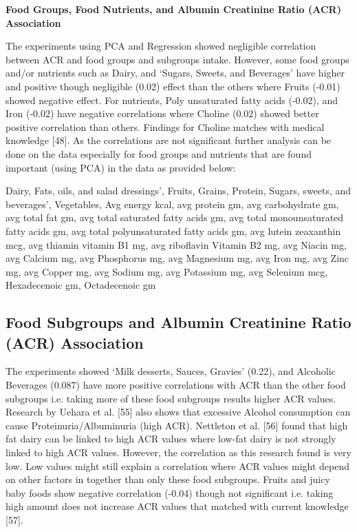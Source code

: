 \noindent \textbf{Food Groups, Food Nutrients, and Albumin Creatinine Ratio (ACR) Association}

\noindent The experiments using PCA and Regression showed negligible correlation between ACR and food groups and subgroups intake. However, some food groups and/or nutrients such as Dairy, and  `Sugars, Sweets, and Beverages'  have higher and positive though negligible (0.02) effect than the others where Fruits (-0.01) showed negative effect.  For nutrients, Poly unsaturated fatty acids (-0.02), and Iron (-0.02) have negative correlations where Choline (0.02) showed better positive correlation than others. Findings for Choline matches with medical knowledge [48]. As the correlations are not significant further analysis can be done on the data especially for food groups and nutrients that are found important (using PCA) in the data as provided below:

\noindent Dairy,  Fats, oils, and salad dressings’,  Fruits,  Grains,  Protein,   Sugars, sweets, and beverages’, Vegetables, Avg energy kcal,  avg protein gm,  avg carbohydrate gm,  avg total fat gm,  avg total saturated fatty acids gm, avg total monounsaturated fatty acids gm,  avg total polyunsaturated fatty acids gm, avg lutein zeaxanthin mcg,  avg thiamin vitamin B1 mg,  avg riboflavin Vitamin B2 mg,  avg Niacin mg, avg Calcium mg,  avg Phosphorus mg,  avg Magnesium mg,  avg Iron mg, avg Zinc mg,  avg Copper mg,  avg Sodium mg,  avg Potassium mg,  avg Selenium mcg,  Hexadecenoic gm,  Octadecenoic gm

\subsection{Food Subgroups and Albumin Creatinine Ratio (ACR) Association}

\noindent The experiments showed  `Milk desserts, Sauces, Gravies' (0.22), and Alcoholic Beverages (0.087) have more positive correlations with ACR than the other food subgroups  i.e. taking more of these food subgroups results higher ACR values. Research by Uehara et al. [55] also shows that excessive Alcohol consumption can cause Proteinuria/Albuminuria (high ACR). Nettleton et al. [56] found that high fat dairy can be linked to high ACR values where low-fat dairy is not strongly linked to high ACR values. However, the correlation as this research found is very low. Low values might still explain a correlation where ACR values might depend on other factors in together than only these food subgroups. Fruits and juicy baby foods show negative correlation (-0.04) though not significant i.e. taking high amount does not increase ACR values that matched with current knowledge [57].

